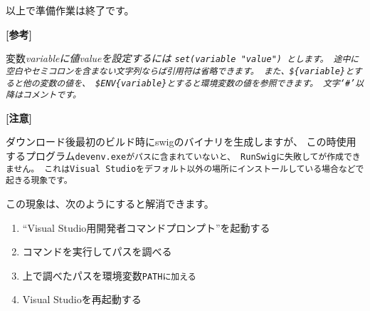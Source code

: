 
\bigskip
以上で準備作業は終了です。

\medskip
\small{\bf{[参考]}}
\begin{narrow}[s][20pt]
	変数\it{variable}に値\it{value}を設定するには
	\tt{set(\it{variable} "\it{value}"}) とします。
	途中に空白やセミコロンを含まない文字列ならば引用符は省略できます。
	また、\tt{\$\{\it{variable}\}}とすると他の変数の値を、
	\tt{\$ENV\{\it{variable}\}}とすると環境変数の値を参照できます。
	文字`\tt{\#}'以降はコメントです。
\end{narrow}

\bigskip
\thinrule{\linewidth}

\bf{[注意]}

ダウンロード後最初のビルド時にswigのバイナリを生成しますが、
この時使用するプログラム\tt{devenv.exe}がパスに含まれていないと、
RunSwigに失敗して\SprLib が作成できません。
これはVisual Studioをデフォルト以外の場所にインストールしている場合などで起きる現象です。

この現象は、次のようにすると解消できます。

\begin{enumerate}
  \item	``Visual Studio用開発者コマンドプロンプト''を起動する
  \item	コマンドを実行してパスを調べる
  \item	上で調べたパスを環境変数\tt{PATH}に加える
  \item	Visual Studioを再起動する
\end{enumerate}

